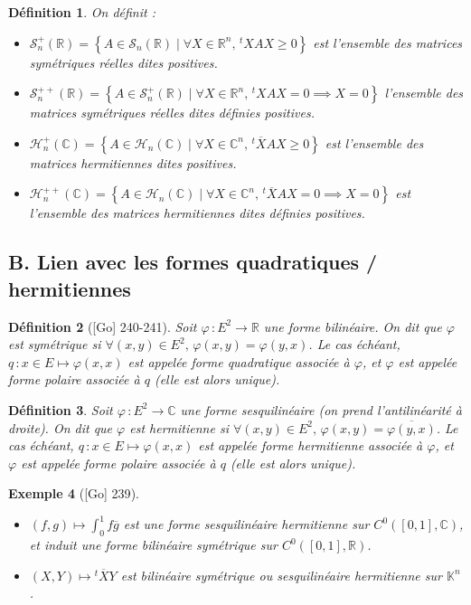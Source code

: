 \documentclass[10pt, a4paper, parskip=full, twoside, twocolumn]{report}
\newtheorem{definition}{Définition}
\newtheorem{example}[definition]{Exemple}
\newcommand{\IK}{\mathbb{K}}
\newcommand{\IC}{\mathbb{C}}
\newcommand{\IR}{\mathbb{R}}
\newcommand{\IRn}{\mathbb{R}^n}
\begin{document}
\begin{definition}
	On définit :
	\begin{itemize}
		\item $\mathcal{S}_n^+(\IR) = \left\{A\in\mathcal{S}_n(\IR)\mid \forall X\in\IRn,\,{}^tXAX \geq 0\right\}$ est l'ensemble des matrices symétriques réelles dites \emph{positives}.
		\item $\mathcal{S}_n^{++}(\IR) = \left\{A\in\mathcal{S}_n^+(\IR)\mid \forall X\in\IRn,\,{}^tXAX = 0\implies X=0\right\}$ l'ensemble des matrices symétriques réelles dites \emph{définies positives}.
		\item $\mathcal{H}_n^+(\IC) = \left\{A\in\mathcal{H}_n(\IC)\mid \forall X\in\IC^n,\,{}^t\overline{X}AX \geq 0\right\}$ est l'ensemble des matrices hermitiennes dites \emph{positives}.
		\item $\mathcal{H}_n^{++}(\IC) = \left\{A\in\mathcal{H}_n(\IC)\mid \forall X\in\IC^n,\,{}^t\overline{X}AX = 0\implies X=0\right\}$ est l'ensemble des matrices hermitiennes dites \emph{définies positives}.
	\end{itemize}
\end{definition}

\subsection*{B. Lien avec les formes quadratiques / hermitiennes}

\begin{definition}[\textnormal{[Go] 240-241}]
	Soit $\varphi\,\colon E^2\to \IR$ une forme bilinéaire. On dit que $\varphi$ est \emph{symétrique} si 
	$\forall(x,y)\in E^2,\, \varphi(x,y)=\varphi(y,x)$. Le cas échéant, $q\,\colon x\in E \mapsto \varphi(x,x)$ est appelée \emph{forme quadratique associée à $\varphi$},
	et $\varphi$ est appelée \emph{forme polaire associée à $q$} (elle est alors unique).
\end{definition}

\begin{definition}
	Soit $\varphi\,\colon E^2\to\IC$ une forme sesquilinéaire (on prend l'antilinéarité à droite).
	On dit que $\varphi$ est \emph{hermitienne} si $\forall(x,y)\in E^2,\,\varphi(x,y)=\overline{\varphi(y,x)}$.
	Le cas échéant, $q\,\colon x\in E\mapsto \varphi(x,x)$ est appelée \emph{forme hermitienne associée à $\varphi$}, et $\varphi$ est appelée \emph{forme polaire associée à $q$} (elle est alors unique).
\end{definition}

\begin{example}[\textnormal{[Go] 239}]
	\begin{itemize}
		\item $(f,g)\mapsto\int_{0}^{1}f\overline{g}$ est une forme sesquilinéaire hermitienne sur $C^0([0,1],\IC)$, et induit une forme bilinéaire symétrique sur $C^0([0,1],\IR)$.
		\item $(X,Y)\mapsto {}^t\overline{X}Y$ est bilinéaire symétrique ou sesquilinéaire hermitienne sur $\IK^n$.
	\end{itemize}
\end{example}
\end{document}
